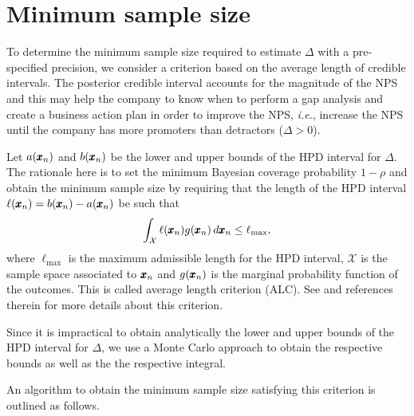 \documentclass[12pt,a4paper]{article}%
\newcommand*{\bff}[1]{\ifmmode\pmb{#1}\else\textbf{#1}\fi}
\begin{document}
\section{Minimum sample size}\label{sec-min-n}

To determine the minimum sample size required to estimate $\Delta$ with a pre-specified precision, we consider a criterion based on the average length of credible intervals. The posterior credible interval accounts for the magnitude of the NPS and this may help the company to know when to perform a gap analysis and create a business action plan in order to improve the NPS, {\it i.e.}, increase the NPS until the company has more promoters than detractors ($\Delta>0$).


Let $a(\bff{x}_n)$ and $b(\bff{x}_n)$ be the lower and upper bounds of the HPD interval for $\Delta$. The rationale here is to set the minimum Bayesian coverage probability $1-\rho$ and obtain the minimum sample size by requiring that the length of the HPD interval $\ell(\bff{x}_n)=b(\bff{x}_n)-a(\bff{x}_n)$ be such that
%
\begin{equation}
 \int_\mathcal{X}\ell(\bff{x}_n)g(\bff{x}_n)\,d\bff{x}_n\leq\ell_{\text{max}},
\end{equation}
%
where $\ell_{\text{max}}$ is the maximum admissible length for the HPD interval, $\mathcal{X}$ is the sample space associated to $\bff{x}_n$ and $g(\bff{x}_n)$ is the marginal probability function of the outcomes. This is called average length criterion (ALC). See \cite{Costaetal21} and references therein for more details about this criterion.

Since it is impractical to obtain analytically the lower and upper bounds of the HPD interval for $\Delta$, we use a Monte Carlo approach \citep{ChenShao99} to obtain the respective bounds as well as the the respective integral.


An algorithm to obtain the minimum sample size satisfying this criterion is outlined as follows.
\end{document}
